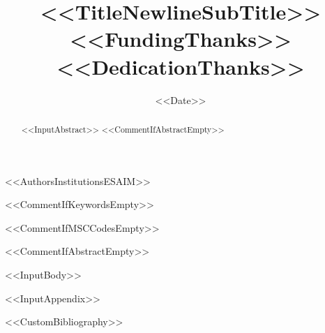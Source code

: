 \documentclass[<<DocumentClassOptions>>]{cocv}
\begin{document}
\title{<<TitleNewlineSubTitle>><<FundingThanks>><<DedicationThanks>>}

<<AuthorsInstitutionsESAIM>>

\date{<<Date>>}

<<CommentIfKeywordsEmpty>>

<<CommentIfMSCCodesEmpty>>

<<CommentIfAbstractEmpty>>\begin{abstract}
<<InputAbstract>>
<<CommentIfAbstractEmpty>>\end{abstract}

\maketitle

<<InputBody>>

\appendix
<<InputAppendix>>


<<CustomBibliography>>
\end{document}
